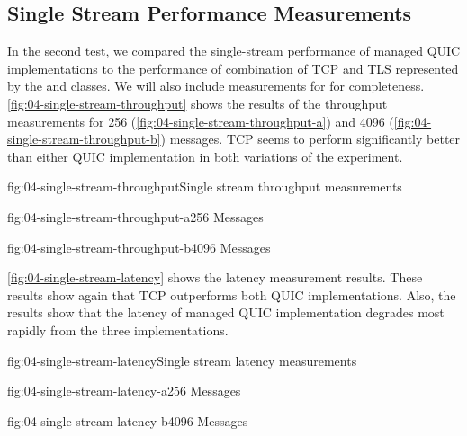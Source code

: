 \subsection{Single Stream Performance Measurements}

In the second test, we compared the single-stream performance of managed QUIC implementations to the
performance of combination of TCP and TLS represented by the \TcpClient{} and \SslStream{} \dotnet{}
classes. We will also include measurements for \libmsquic{} for completeness.
\autoref{fig:04-single-stream-throughput} shows the results of the throughput measurements for
\SI{256}{\byte} (\autoref{fig:04-single-stream-throughput-a}) and \SI{4096}{\byte}
(\autoref{fig:04-single-stream-throughput-b}) messages. TCP seems to perform significantly better
than either QUIC implementation in both variations of the experiment.

\begin{myFigure}{fig:04-single-stream-throughput}{Single stream throughput measurements}
\begin{mySubfigure}{0.49\linewidth}{fig:04-single-stream-throughput-a}{\SI{256}{\byte} Messages}
\footnotesize

\end{mySubfigure}
\begin{mySubfigure}{0.49\linewidth}{fig:04-single-stream-throughput-b}{\SI{4096}{\byte} Messages}
\footnotesize

\end{mySubfigure}
\end{myFigure}

\autoref{fig:04-single-stream-latency} shows the latency measurement results. These results show
again that TCP outperforms both QUIC implementations. Also, the results show that the latency of
managed QUIC implementation degrades most rapidly from the three implementations.

\begin{myFigure}{fig:04-single-stream-latency}{Single stream latency measurements}
\begin{mySubfigure}{0.49\linewidth}{fig:04-single-stream-latency-a}{\SI{256}{\byte} Messages}
\footnotesize

\end{mySubfigure}
\begin{mySubfigure}{0.49\linewidth}{fig:04-single-stream-latency-b}{\SI{4096}{\byte} Messages}
\footnotesize

\end{mySubfigure}
\end{myFigure}

